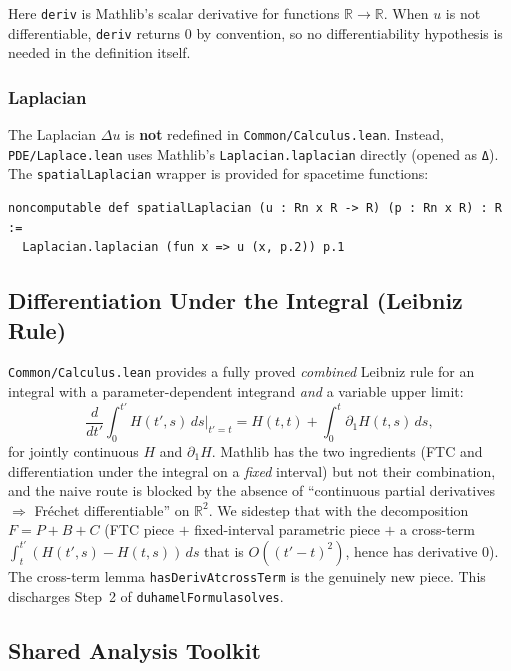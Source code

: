 ﻿\documentclass[12pt, a4paper]{article}
\renewcommand{\_}{\origunderscore\allowbreak}
\theoremstyle{definition}
\theoremstyle{plain}
\begin{document}
Here \texttt{deriv} is Mathlib's scalar derivative for functions $\mathbb{R} \to \mathbb{R}$.
When $u$ is not differentiable, \texttt{deriv} returns $0$ by convention,
so no differentiability hypothesis is needed in the definition itself.

\subsubsection{Laplacian}

The Laplacian $\Delta u$ is \textbf{not} redefined in \texttt{Common/\allowbreak Calculus.\allowbreak lean}.
Instead, \texttt{PDE/\allowbreak Laplace.\allowbreak lean} uses Mathlib's \texttt{Laplacian.laplacian} directly
(opened as \texttt{Δ}). The \texttt{spatialLaplacian} wrapper is provided for
spacetime functions:

\begin{lstlisting}[caption={Spatial Laplacian for spacetime functions}]
noncomputable def spatialLaplacian (u : Rn x R -> R) (p : Rn x R) : R :=
  Laplacian.laplacian (fun x => u (x, p.2)) p.1
\end{lstlisting}

\subsection{Differentiation Under the Integral (Leibniz Rule)}

\texttt{Common/\allowbreak Calculus.\allowbreak lean} provides a fully proved \emph{combined} Leibniz rule for an integral
with a parameter-dependent integrand \emph{and} a variable upper limit:
\[
  \frac{d}{dt'}\int_0^{t'} H(t',s)\,ds\Big|_{t'=t}
    = H(t,t) + \int_0^t \partial_1 H(t,s)\,ds,
\]
for jointly continuous $H$ and $\partial_1 H$. Mathlib has the two ingredients (FTC and
differentiation under the integral on a \emph{fixed} interval) but not their combination, and
the naive route is blocked by the absence of ``continuous partial derivatives $\Rightarrow$
Fréchet differentiable'' on $\mathbb{R}^2$. We sidestep that with the decomposition
$F = P + B + C$ (FTC piece $+$ fixed-interval parametric piece $+$ a cross-term
$\int_t^{t'}(H(t',s)-H(t,s))\,ds$ that is $O((t'-t)^2)$, hence has derivative $0$). The
cross-term lemma \texttt{hasDerivAt\_crossTerm} is the genuinely new piece. This discharges
Step~2 of \texttt{duhamelFormula\_solves}.

\subsection{Shared Analysis Toolkit}
\end{document}
